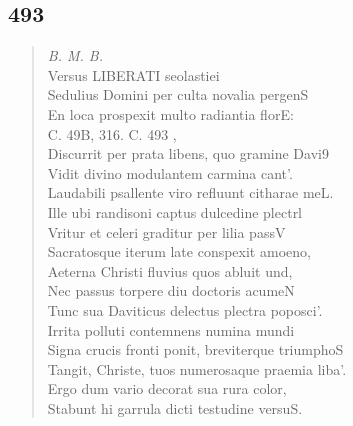 \documentclass[11pt, a4paper]{report}
\begin{document}
            \subsection*{493}
      \begin{verse}
      \textit{B. M. B.} \\ Versus LIBERATI seolastiei \\ Sedulius Domini per culta novalia pergenS \\ En loca prospexit multo radiantia florE: \\ 
        ﻿\pagebreak 
    C. 49B, 316. C. 493 , \\ Discurrit per prata libens, quo gramine Davi9 \\ Vidit divino modulantem carmina cant’. \\ Laudabili psallente viro refluunt citharae meL. \\ Ille ubi randisoni captus dulcedine plectrl \\ Vritur et celeri graditur per lilia passV \\ Sacratosque iterum late conspexit amoeno, \\ Aeterna Christi fluvius quos abluit und, \\ Nec passus torpere diu doctoris acumeN \\ Tunc sua Daviticus delectus plectra poposci’. \\ Irrita polluti contemnens numina mundi \\ Signa crucis fronti ponit, breviterque triumphoS \\ Tangit, Christe, tuos numerosaque praemia liba’. \\ Ergo dum vario decorat sua rura color, \\ Stabunt hi garrula dicti testudine versuS. \\ 
      \end{verse}
  
\end{document}
